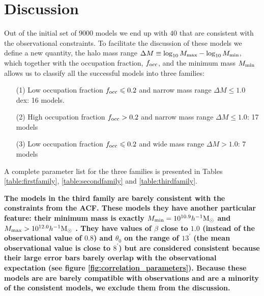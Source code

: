 \documentclass[usenatbib]{mn2e}
\newcommand{\hMsun}{{\ifmmode{h^{-1}{\rm
        {M_{\odot}}}}\else{$h^{-1}{\rm{M_{\odot}}}$}\fi}}
\begin{document}
\section{Discussion}
\label{sec:discussion}




Out of the initial set of $9000$ models we end up with $40$ that are
consistent with the observational constraints. To facilitate the
discussion of these models we define a new quantity, the halo mass
range $\Delta M\equiv \log_{10}M_{\rm max} - \log_{10}M_{\rm  min}$, which
together with the occupation fraction, $f_{\rm occ}$, and the minimum
mass $M_{\rm min}$ allows us to classify all the successful models into
three families:     
  

\begin{itemize}
\item[(1)] Low occupation fraction $f_{\rm occ}\leq 0.2$ and narrow
  mass range $\Delta M\leq 1.0$ 
  dex: 16 models. 
\item[(2)] High occupation fraction $f_{\rm occ}> 0.2$ and
  narrow mass range $\Delta M\leq 1.0$: 17 models 
\item[(3)] Low occupation fraction $f_{\rm occ}\leq 0.2$ 
  and wide mass range $\Delta M>1.0$: 7 models
\end{itemize}


A complete parameter list for the three families is presented in Tables
\ref{table:firstfamily}, \ref{table:secondfamily}  and 
\ref{table:thirdfamily}.  

{\bf The models in the third family are barely consistent with the
  constraints from the ACF. These models they have another particular
  feature: their minimum mass is exactly $M_{\rm min}=10^{10.9}\hMsun$
  and $M_{\rm max}>10^{12.0}\hMsun$ . They have values of $\beta$
  close to $1.0$ (instead of the observational value of $0.8$) and
  $\theta_0$ on the range of $13^{\prime}$ (the mean observational
  value is close to $8^{\prime}$) but are considered consistent
  because their large error bars barely overlap with the observational
  expectation (see figure \ref{fig:correlation_parameters}).
  Because these models are are barely compatible with observations and
  are a minority of the consistent models, we exclude them from the
  discussion.} 
\end{document}
